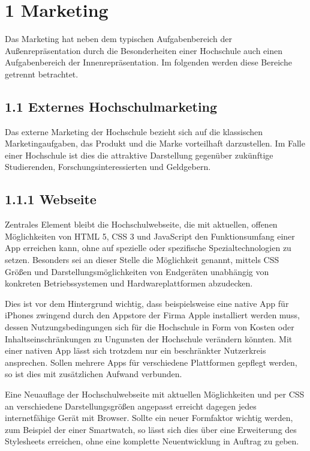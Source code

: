 \documentclass[a4paper]{article}
\title{}
\begin{document}
\section{1 Marketing}
{\sffamily
Das Marketing hat neben dem typischen Aufgabenbereich der Außenrepräsentation durch die Besonderheiten einer Hochschule
auch einen Aufgabenbereich der Innenrepräsentation. Im folgenden werden diese Bereiche getrennt betrachtet.}

\subsection{1.1 Externes Hochschulmarketing}
{\sffamily
Das externe Marketing der Hochschule bezieht sich auf die klassischen Marketingaufgaben, das Produkt und die Marke
vorteilhaft darzustellen. Im Falle einer Hochschule ist dies die attraktive Darstellung gegenüber zukünftige
Studierenden, Forschungsinteressierten und Geldgebern.}

\subsection{1.1.1 Webseite}
{\sffamily
Zentrales Element bleibt die Hochschulwebseite, die mit aktuellen, offenen Möglichkeiten von HTML 5, CSS 3 und
JavaScript den Funktionsumfang einer App erreichen kann, ohne auf spezielle oder spezifische Spezialtechnologien zu
setzen. Besonders sei an dieser Stelle die Möglichkeit genannt, mittels CSS Größen und Darstellungsmöglichkeiten von
Endgeräten unabhängig von konkreten Betriebssystemen und Hardwareplattformen abzudecken.}

{\sffamily
Dies ist vor dem Hintergrund wichtig, dass beispielsweise eine native App für iPhones zwingend durch den Appstore der
Firma Apple installiert werden muss, dessen Nutzungsbedingungen sich für die Hochschule in Form von Kosten oder
Inhaltseinschränkungen zu Ungunsten der Hochschule verändern könnten. Mit einer nativen App lässt sich trotzdem nur ein
beschränkter Nutzerkreis ansprechen. Sollen mehrere Apps für verschiedene Plattformen gepflegt werden, so ist dies mit
zusätzlichen Aufwand verbunden.}

{\sffamily
Eine Neuauflage der Hochschulwebseite mit aktuellen Möglichkeiten und per CSS an verschiedene Darstellungsgrößen
angepasst erreicht dagegen jedes internetfähige Gerät mit Browser. Sollte ein neuer Formfaktor wichtig werden, zum
Beispiel der einer Smartwatch, so lässt sich dies über eine Erweiterung des Stylesheets erreichen, ohne eine komplette
Neuentwicklung in Auftrag zu geben.}
\end{document}
